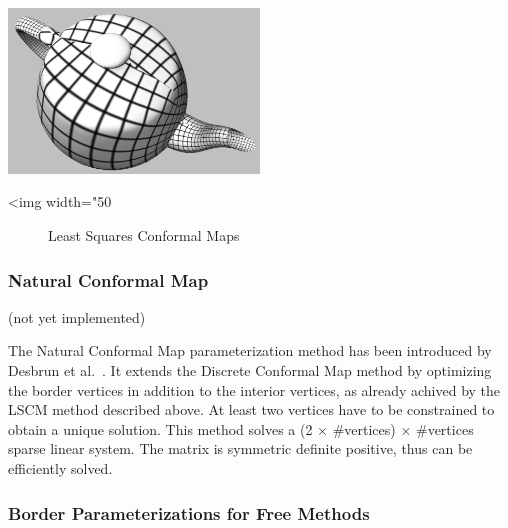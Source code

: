 \begin{center}
    \label{Surface_mesh_parameterization-fig-LSCM}
    \begin{ccTexOnly}
        \includegraphics[width=0.5\textwidth]{Surface_mesh_parameterization/LSCM} %
    \end{ccTexOnly}
    \begin{ccHtmlOnly}
        <img width="50%
    \end{ccHtmlOnly}
    \begin{figure}[h]
        \caption{Least Squares Conformal Maps}
    \end{figure}
\end{center}


\subsubsection{Natural Conformal Map}

(not yet implemented)

The Natural Conformal Map parameterization method has been introduced
by Desbrun et al.~\cite{cgal:dma-ipsm-02}. It extends the Discrete
Conformal Map method by optimizing the border vertices in addition
to the interior vertices, as already achived by the LSCM method
described above. At least two vertices have to be constrained to
obtain a unique solution. This method solves a (2 $\times$ \#vertices) $\times$
\#vertices sparse linear system.  The matrix is symmetric definite
positive, thus can be efficiently solved.



\subsubsection{Border Parameterizations for Free Methods}

  \\

